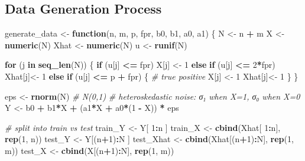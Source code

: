 \documentclass[
]{article}
\newenvironment{Shaded}{\begin{snugshade}}{\end{snugshade}}
\newcommand{\CommentTok}[1]{\textcolor[rgb]{0.56,0.35,0.01}{\textit{#1}}}
\newcommand{\ControlFlowTok}[1]{\textcolor[rgb]{0.13,0.29,0.53}{\textbf{#1}}}
\newcommand{\DecValTok}[1]{\textcolor[rgb]{0.00,0.00,0.81}{#1}}
\newcommand{\FunctionTok}[1]{\textcolor[rgb]{0.13,0.29,0.53}{\textbf{#1}}}
\newcommand{\NormalTok}[1]{#1}
\newcommand{\OtherTok}[1]{\textcolor[rgb]{0.56,0.35,0.01}{#1}}
\newcommand{\SpecialCharTok}[1]{\textcolor[rgb]{0.81,0.36,0.00}{\textbf{#1}}}
\begin{document}
\subsection{Data Generation Process}\label{data-generation-process}

\begin{Shaded}
\begin{Highlighting}[]
\NormalTok{generate\_data }\OtherTok{\textless{}{-}} \ControlFlowTok{function}\NormalTok{(n, m, p, fpr, b0, b1, a0, a1) \{}
\NormalTok{  N    }\OtherTok{\textless{}{-}}\NormalTok{ n }\SpecialCharTok{+}\NormalTok{ m}
\NormalTok{  X    }\OtherTok{\textless{}{-}} \FunctionTok{numeric}\NormalTok{(N)}
\NormalTok{  Xhat }\OtherTok{\textless{}{-}} \FunctionTok{numeric}\NormalTok{(N)}
\NormalTok{  u    }\OtherTok{\textless{}{-}} \FunctionTok{runif}\NormalTok{(N)}
  
  \ControlFlowTok{for}\NormalTok{ (j }\ControlFlowTok{in} \FunctionTok{seq\_len}\NormalTok{(N)) \{}
    \ControlFlowTok{if}\NormalTok{      (u[j] }\SpecialCharTok{\textless{}=}\NormalTok{ fpr)           X[j]   }\OtherTok{\textless{}{-}} \DecValTok{1}
    \ControlFlowTok{else} \ControlFlowTok{if}\NormalTok{ (u[j] }\SpecialCharTok{\textless{}=} \DecValTok{2}\SpecialCharTok{*}\NormalTok{fpr)         Xhat[j]}\OtherTok{\textless{}{-}} \DecValTok{1}
    \ControlFlowTok{else} \ControlFlowTok{if}\NormalTok{ (u[j] }\SpecialCharTok{\textless{}=}\NormalTok{ p }\SpecialCharTok{+}\NormalTok{ fpr) \{     }\CommentTok{\# true positive}
\NormalTok{      X[j]   }\OtherTok{\textless{}{-}} \DecValTok{1}
\NormalTok{      Xhat[j]}\OtherTok{\textless{}{-}} \DecValTok{1}
\NormalTok{    \}}
\NormalTok{  \}}
  
\NormalTok{  eps }\OtherTok{\textless{}{-}} \FunctionTok{rnorm}\NormalTok{(N)  }\CommentTok{\# N(0,1)}
  \CommentTok{\# heteroskedastic noise: σ₁ when X=1, σ₀ when X=0}
\NormalTok{  Y }\OtherTok{\textless{}{-}}\NormalTok{ b0 }\SpecialCharTok{+}\NormalTok{ b1}\SpecialCharTok{*}\NormalTok{X }\SpecialCharTok{+}\NormalTok{ (a1}\SpecialCharTok{*}\NormalTok{X }\SpecialCharTok{+}\NormalTok{ a0}\SpecialCharTok{*}\NormalTok{(}\DecValTok{1} \SpecialCharTok{{-}}\NormalTok{ X)) }\SpecialCharTok{*}\NormalTok{ eps}
  
  \CommentTok{\# split into train vs test}
\NormalTok{  train\_Y   }\OtherTok{\textless{}{-}}\NormalTok{ Y[       }\DecValTok{1}\SpecialCharTok{:}\NormalTok{n    ]}
\NormalTok{  train\_X   }\OtherTok{\textless{}{-}} \FunctionTok{cbind}\NormalTok{(Xhat[    }\DecValTok{1}\SpecialCharTok{:}\NormalTok{n],    }\FunctionTok{rep}\NormalTok{(}\DecValTok{1}\NormalTok{, n))}
\NormalTok{  test\_Y    }\OtherTok{\textless{}{-}}\NormalTok{ Y[(n}\SpecialCharTok{+}\DecValTok{1}\NormalTok{)}\SpecialCharTok{:}\NormalTok{N      ]}
\NormalTok{  test\_Xhat }\OtherTok{\textless{}{-}} \FunctionTok{cbind}\NormalTok{(Xhat[(n}\SpecialCharTok{+}\DecValTok{1}\NormalTok{)}\SpecialCharTok{:}\NormalTok{N],    }\FunctionTok{rep}\NormalTok{(}\DecValTok{1}\NormalTok{, m))}
\NormalTok{  test\_X    }\OtherTok{\textless{}{-}} \FunctionTok{cbind}\NormalTok{(X[(n}\SpecialCharTok{+}\DecValTok{1}\NormalTok{)}\SpecialCharTok{:}\NormalTok{N],       }\FunctionTok{rep}\NormalTok{(}\DecValTok{1}\NormalTok{, m))}
  

\end{Highlighting}
\end{Shaded}
\end{document}

